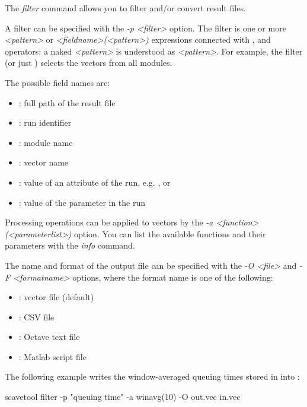 The \textit{filter} command allows you to filter and/or convert result files.

A filter can be specified with the \textit{-p <filter>} option.
The filter is one or more \textit{<pattern>} or \textit{<fieldname>(<pattern>)}
expressions connected with ,  and  operators;
a naked \textit{<pattern>} is understood as \textit{<pattern>}\ttt{)}.
For example, the filter  (or just
) selects the  vectors from all
 modules.

The possible field names are:

\begin{itemize}
    \item{}: full path of the result file
    \item{}: run identifier
    \item{}: module name
    \item{}: vector name
    \item{}: value of an attribute of the run,
        e.g. ,  or 
    \item{}: value of the parameter in the run
\end{itemize}

Processing operations can be applied to vectors by the
\textit{-a <function>(<parameterlist>)} option. You can list
the available functions and their parameters with the \textit{info} command.

The name and format of the output file can be specified with the
\textit{-O <file>} and \textit{-F <formatname>} options, where
the format name is one of the following:

\begin{itemize}
    \item{}: vector file (default)
    \item{}: CSV file
    \item{}: Octave text file
    \item{}: Matlab script file
\end{itemize}

The following example writes the window-averaged queuing times stored
in  into :

\begin{commandline}
scavetool filter -p "queuing time" -a winavg(10) -O out.vec in.vec
\end{commandline}

